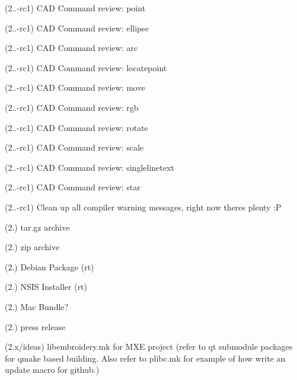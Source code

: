 \begin{DoxyRefList}
\label{todo__todo000052}%
%
(2..-\/rc1) CAD Command review\+: point

\label{todo__todo000053}%
%
(2..-\/rc1) CAD Command review\+: ellipse

\label{todo__todo000054}%
%
(2..-\/rc1) CAD Command review\+: arc

\label{todo__todo000056}%
%
(2..-\/rc1) CAD Command review\+: locatepoint

\label{todo__todo000057}%
%
(2..-\/rc1) CAD Command review\+: move

\label{todo__todo000058}%
%
(2..-\/rc1) CAD Command review\+: rgb

\label{todo__todo000059}%
%
(2..-\/rc1) CAD Command review\+: rotate

\label{todo__todo000060}%
%
(2..-\/rc1) CAD Command review\+: scale

\label{todo__todo000061}%
%
(2..-\/rc1) CAD Command review\+: singlelinetext

\label{todo__todo000062}%
%
(2..-\/rc1) CAD Command review\+: star

\label{todo__todo000063}%
%
(2..-\/rc1) Clean up all compiler warning messages, right now theres plenty \+:P

\label{todo__todo000064}%
%
(2.) tar.\+gz archive

\label{todo__todo000065}%
%
(2.) zip archive

\label{todo__todo000066}%
%
(2.) Debian Package (rt)

\label{todo__todo000067}%
%
(2.) NSIS Installer (rt)

\label{todo__todo000068}%
%
(2.) Mac Bundle?

\label{todo__todo000069}%
%
(2.) press release

\label{todo__todo000070}%
%
(2.\+x/ideas) libembroidery.\+mk for MXE project (refer to qt submodule packages for qmake based building. Also refer to plibc.\+mk for example of how write an update macro for github.)


\end{DoxyRefList}
